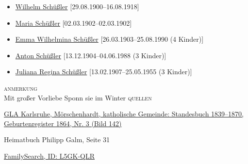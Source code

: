 \begin{person}[
    surname = {Gramlich},
    givenname = {Helena},
    suffix = {1864--1943},
    label = {@I151@},
    filename = {Helena Gramlich (1864)}
    ]
\begin{itemize}
\item \hyperref[@I174@]{Wilhelm Schüßler} [29.08.1900--16.08.1918]
\item \hyperref[@I1776@]{Maria Schüßler} [02.03.1902--02.03.1902]
\item \hyperref[@I177@]{Emma Wilhelmina Schüßler} [26.03.1903--25.08.1990 (4 Kinder)]
\item \hyperref[@I175@]{Anton Schüßler} [13.12.1904--04.06.1988 (3 Kinder)]
\item \hyperref[@I179@]{Juliana Regina Schüßler} [13.02.1907--25.05.1955 (3 Kinder)]
\end{itemize}
\medbreak
\textsc{anmerkung}\\
Mit großer Vorliebe Sponn sie im Winter
\medbreak
\textsc{{quellen}}
\begin{enumerate}[label={[\arabic*]}]
\item \href{http://www.landesarchiv-bw.de/plink/?f=4-1119442-142}{GLA Karlsruhe, Mörschenhardt, katholische Gemeinde: Standesbuch 1839–1870, Geburtenregister 1864, Nr. 3 (Bild 142)}
\item Heimatbuch Philipp Galm, Seite 31
\item \href{https://www.familysearch.org/tree/person/details/L5GK-QLR}{FamilySearch, ID: L5GK-QLR}
\end{enumerate}

\end{person}

